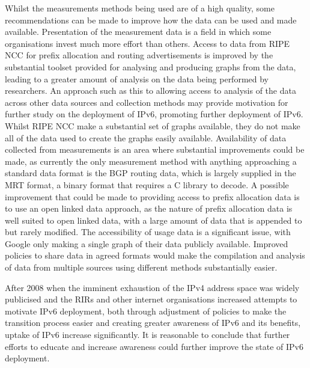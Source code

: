 Whilst the measurements methods being used are of a high quality, some
recommendations can be made to improve how the data can be used and made
available. Presentation of the measurement data is a field in which some
organisations invest much more effort than others. Access to data from RIPE
NCC for prefix allocation and routing
advertisements is improved by the substantial toolset provided for analysing
and producing graphs from the data, leading to a greater amount of analysis on the data
being performed by researchers. An approach such as this to allowing access to
analysis of the data across other data sources and collection methods may
provide motivation for further study on the deployment of IPv6, promoting
further deployment of IPv6. Whilst RIPE NCC make a substantial set of graphs
available, they do not make all of the data used to create the graphs easily
available. Availability of data collected from measurements is an area where
substantial improvements could be made, as currently the only measurement method
with anything approaching a standard data format is the BGP routing data, which
is largely supplied in the MRT format, a binary format that requires a C library
to decode. A possible improvement that could be made to providing access to
prefix allocation data is to use an open linked data approach, as the nature of prefix
allocation data is well suited to open linked data, with a large amount of data
that is appended to but rarely modified. The accessibility of usage data is a
significant issue, with Google only making a single graph of their data publicly
available. Improved policies to share data in agreed formats would make the
compilation and analysis of data from multiple sources using different methods
substantially easier. 

 After 2008 when the imminent exhaustion of the IPv4 address space was
widely publicised and the RIRs and other internet organisations increased
attempts to motivate IPv6 deployment, both through adjustment of policies to
make the transition process easier and creating greater awareness of IPv6 and
its benefits, uptake of IPv6 increase significantly. It is reasonable to
conclude that further efforts to educate and increase awareness could further
improve the state of IPv6 deployment.

